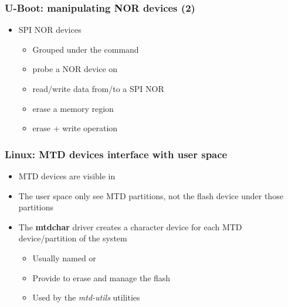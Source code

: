 \begin{frame}
  \frametitle{U-Boot: manipulating NOR devices (2)}
  \begin{itemize}
  \item SPI NOR devices
    \begin{itemize}
    \item Grouped under the  command
    \item {} probe a NOR device on
    \item {} read/write data
       from/to a SPI NOR
    \item {} erase a memory region
    \item {} erase + write operation
    \end{itemize}
  \end{itemize}
\end{frame}

\begin{frame}
  \frametitle{Linux: MTD devices interface with user space}
  \begin{itemize}
  \item MTD devices are visible in 
  \item The user space only see MTD partitions, not the flash device
    under those partitions
  \item The {\bf mtdchar} driver creates a character device for each
    MTD device/partition of the system
    \begin{itemize}
    \item Usually named  or 
    \item Provide  to erase and manage the flash
    \item Used by the {\em mtd-utils} utilities
    \end{itemize}
  \end{itemize}
\end{frame}

